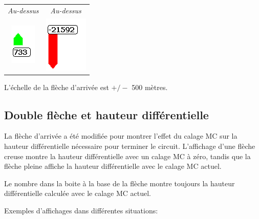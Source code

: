 \begin{center}
\begin{tabular}{c c}
{\it Au-dessus} & {\it Au-dessus} \\
\includegraphics[angle=0,width=0.15\linewidth,keepaspectratio='true']{figures/cut-fg-above.png} &
\includegraphics[angle=0,width=0.2\linewidth,keepaspectratio='true']{figures/cut-fg-below.png} \\
\end{tabular}
\end{center}

L'échelle de la flèche d'arrivée est $+/-$ 500 mètres.

\subsection*{Double flèche et hauteur différentielle}

La flèche d'arrivée a été modifiée pour montrer l'effet du calage MC sur la hauteur différentielle nécessaire pour terminer le circuit. L'affichage d'une flèche creuse montre la hauteur différentielle avec un calage MC à zéro, tandis que la flèche pleine affiche la hauteur différentielle avec le calage MC actuel.

Le nombre dans la boite à la base de la flèche montre toujours la hauteur différentielle calculée avec le calage MC actuel.

Exemples d'affichages dans différentes situations:

